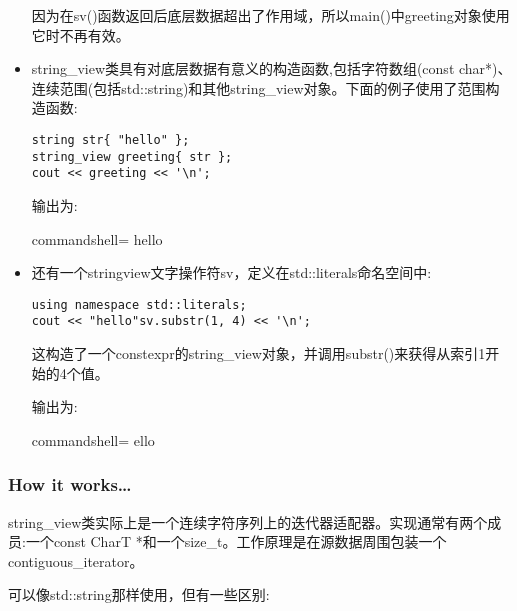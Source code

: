 \begin{itemize}
因为在sv()函数返回后底层数据超出了作用域，所以main()中greeting对象使用它时不再有效。

\item 
string\_view类具有对底层数据有意义的构造函数,包括字符数组(const char*)、连续范围(包括std::string)和其他string\_view对象。下面的例子使用了范围构造函数:

\begin{lstlisting}[style=styleCXX]
string str{ "hello" };
string_view greeting{ str };
cout << greeting << '\n';
\end{lstlisting}

输出为:

\begin{tcblisting}{commandshell={}}
hello
\end{tcblisting}

\item 
还有一个stringview文字操作符sv，定义在std::literals命名空间中:

\begin{lstlisting}[style=styleCXX]
using namespace std::literals;
cout << "hello"sv.substr(1, 4) << '\n';
\end{lstlisting}

这构造了一个constexpr的string\_view对象，并调用substr()来获得从索引1开始的4个值。

输出为:

\begin{tcblisting}{commandshell={}}
ello
\end{tcblisting}
\end{itemize}

\subsubsection{How it works…}

string\_view类实际上是一个连续字符序列上的迭代器适配器。实现通常有两个成员:一个const CharT *和一个size\_t。工作原理是在源数据周围包装一个contiguous\_iterator。

可以像std::string那样使用，但有一些区别:

